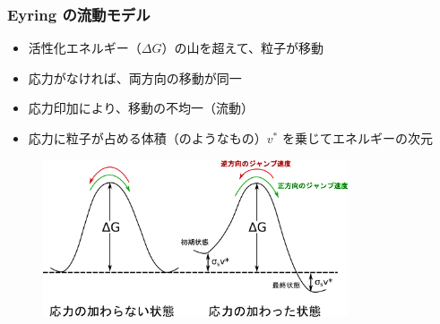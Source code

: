 \documentclass[10pt, dvipdfmx]{beamer}
\begin{document}
\begin{frame}
\frametitle{Eyring の流動モデル}

\begin{itemize}
\item 活性化エネルギー（$\Delta G$）の山を超えて、粒子が移動
\item 応力がなければ、両方向の移動が同一
\item 応力印加により、移動の不均一（流動）
\item 応力に粒子が占める体積（のようなもの）$v^*$ を乗じてエネルギーの次元
\end{itemize}

\begin{figure}
 \centering
	\includegraphics[width=9cm]{flow_under_stress.png}
\end{figure}
\end{frame}


\end{document}
